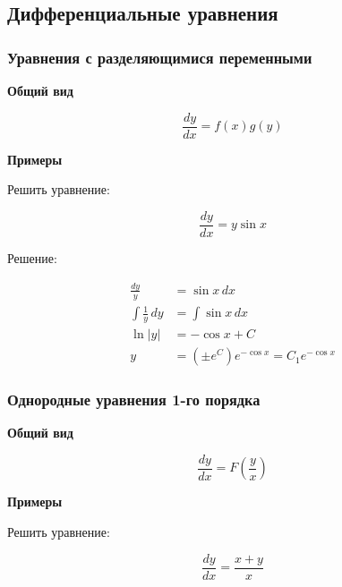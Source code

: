 \subsection{Дифференциальные уравнения}


\subsubsection{Уравнения с разделяющимися переменными}

\textbf{Общий вид}

\begin{equation*}
    \frac{dy}{dx} = f(x)g(y)
\end{equation*}

\textbf{Примеры}

Решить уравнение:

\begin{equation*}
    \frac{dy}{dx} = y \sin x
\end{equation*}

Решение:

\begin{align*}
    \frac{dy}{y} &= \sin x \, dx \\
    \int \frac{1}{y} \, dy &= \int \sin x \, dx \\
    \ln |y| &= -\cos x + C \\
    y &= (\pm e^{C}) e^{-\cos x} = C_1 e^{-\cos x}
\end{align*}

\subsubsection{Однородные уравнения 1-го порядка}

\textbf{Общий вид}

\begin{equation*}
    \frac{dy}{dx} = F\left(\frac{y}{x}\right)
\end{equation*}

\textbf{Примеры}

Решить уравнение:

\begin{equation*}
    \frac{dy}{dx} = \frac{x+y}{x}
\end{equation*}

